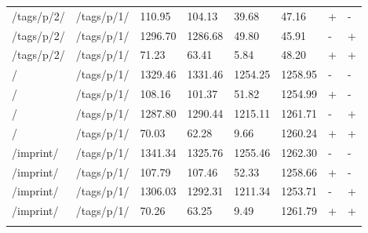 \begin{appendix}
\begin{center}
\begin{longtable}{llllllll}
/tags/p/2/ & /tags/p/1/ & 110.95 & 104.13 & 39.68 & 47.16 & + & - \\
/tags/p/2/ & /tags/p/1/ & 1296.70 & 1286.68 & 49.80 & 45.91 & - & + \\
/tags/p/2/ & /tags/p/1/ & 71.23 & 63.41 & 5.84 & 48.20 & + & + \\
\hline
\hline
/ & /tags/p/1/ & 1329.46 & 1331.46 & 1254.25 & 1258.95 & - & - \\
/ & /tags/p/1/ & 108.16 & 101.37 & 51.82 & 1254.99 & + & - \\
/ & /tags/p/1/ & 1287.80 & 1290.44 & 1215.11 & 1261.71 & - & + \\
/ & /tags/p/1/ & 70.03 & 62.28 & 9.66 & 1260.24 & + & + \\
\hline
/imprint/ & /tags/p/1/ & 1341.34 & 1325.76 & 1255.46 & 1262.30 & - & - \\
/imprint/ & /tags/p/1/ & 107.79 & 107.46 & 52.33 & 1258.66 & + & - \\
/imprint/ & /tags/p/1/ & 1306.03 & 1292.31 & 1211.34 & 1253.71 & - & + \\
/imprint/ & /tags/p/1/ & 70.26 & 63.25 & 9.49 & 1261.79 & + & + \\
\hline
\label{tab:selenium_benchmark_results_local}
\end{longtable}
\end{center}

\newpage{}


\end{appendix}

